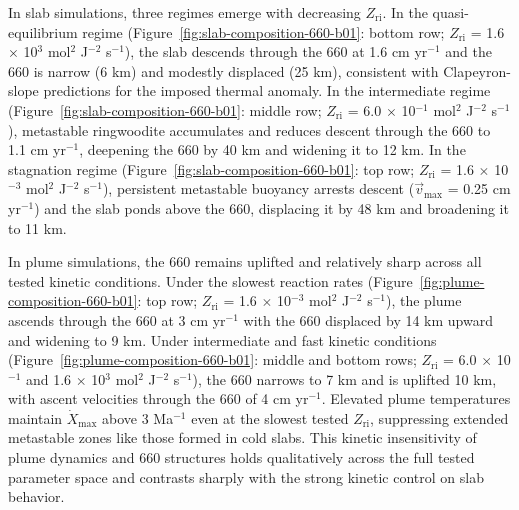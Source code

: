 \documentclass[draft,linenumbers]{agujournal2019}
\begin{document}
In slab simulations, three regimes emerge with decreasing
\(Z_\mathrm{ri}\). In the quasi-equilibrium regime
(Figure~\ref{fig:slab-composition-660-b01}: bottom row;
\(Z_\mathrm{ri}\) = 1.6 \(\times\) 10\(^3\) mol\(^2\) J\(^{-2}\)
s\(^{-1}\)), the slab descends through the 660 at 1.6 cm yr\(^{-1}\) and
the 660 is narrow (6 km) and modestly displaced (25 km), consistent with
Clapeyron-slope predictions for the imposed thermal anomaly. In the
intermediate regime (Figure~\ref{fig:slab-composition-660-b01}: middle
row; \(Z_\mathrm{ri}\) = 6.0 \(\times\) 10\(^{-1}\) mol\(^2\) J\(^{-2}\)
s\(^{-1}\)), metastable ringwoodite accumulates and reduces descent
through the 660 to 1.1 cm yr\(^{-1}\), deepening the 660 by 40 km and
widening it to 12 km. In the stagnation regime
(Figure~\ref{fig:slab-composition-660-b01}: top row; \(Z_\mathrm{ri}\) =
1.6 \(\times\) 10\(^{-3}\) mol\(^2\) J\(^{-2}\) s\(^{-1}\)), persistent
metastable buoyancy arrests descent (\(\vec{v}_\mathrm{max}\) = 0.25 cm
yr\(^{-1}\)) and the slab ponds above the 660, displacing it by 48 km
and broadening it to 11 km.

In plume simulations, the 660 remains uplifted and relatively sharp
across all tested kinetic conditions. Under the slowest reaction rates
(Figure~\ref{fig:plume-composition-660-b01}: top row; \(Z_\mathrm{ri}\)
= 1.6 \(\times\) 10\(^{-3}\) mol\(^2\) J\(^{-2}\) s\(^{-1}\)), the plume
ascends through the 660 at 3 cm yr\(^{-1}\) with the 660 displaced by 14
km upward and widening to 9 km. Under intermediate and fast kinetic
conditions (Figure~\ref{fig:plume-composition-660-b01}: middle and
bottom rows; \(Z_\mathrm{ri}\) = 6.0 \(\times\) 10\(^{-1}\) and 1.6
\(\times\) 10\(^3\) mol\(^2\) J\(^{-2}\) s\(^{-1}\)), the 660 narrows to
7 km and is uplifted 10 km, with ascent velocities through the 660 of 4
cm yr\(^{-1}\). Elevated plume temperatures maintain
\(\dot{X}_\mathrm{max}\) above 3 Ma\(^{-1}\) even at the slowest tested
\(Z_\mathrm{ri}\), suppressing extended metastable zones like those
formed in cold slabs. This kinetic insensitivity of plume dynamics and
660 structures holds qualitatively across the full tested parameter
space and contrasts sharply with the strong kinetic control on slab
behavior.
\end{document}
